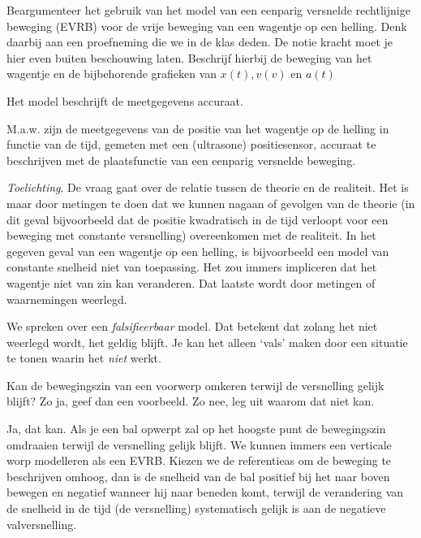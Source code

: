 \documentclass{ximera}
\begin{document}
\begin{exercise}
	Beargumenteer het gebruik van het model van een eenparig versnelde rechtlijnige beweging (EVRB) voor de vrije beweging van een wagentje op een helling. 
	Denk daarbij aan een proefneming die we in de klas deden. 
	De notie kracht moet je hier even buiten beschouwing laten.
	Beschrijf hierbij de beweging van het wagentje en de bijbehorende grafieken van \(x(t), v(v) \text{ en } a(t)\)
	\begin{oplossing}
		Het model beschrijft de meetgegevens accuraat.

		M.a.w. zijn de meetgegevens van de positie van het wagentje op de helling in functie van de tijd, gemeten met een (ultrasone) positiesensor, accuraat te beschrijven met de plaatsfunctie van een eenparig versnelde beweging.

		\emph{Toelichting}.
		De vraag gaat over de relatie tussen de theorie en de realiteit. Het is maar door metingen te doen dat we kunnen nagaan of gevolgen van de theorie (in dit geval bijvoorbeeld dat de positie kwadratisch in de tijd verloopt voor een beweging met constante versnelling) overeenkomen met de realiteit. In het gegeven geval van een wagentje op een helling, is bijvoorbeeld een model van constante snelheid niet van toepassing. Het zou immers impliceren dat het wagentje niet van zin kan veranderen. Dat laatste wordt door metingen of waarnemingen weerlegd.

		We spreken over een \textit{falsifieerbaar} model. Dat betekent dat zolang het niet weerlegd wordt, het geldig blijft. Je kan het alleen `vals' maken door een situatie te tonen waarin het \textit{niet} werkt.
	\end{oplossing} 
\end{exercise}


\begin{exercise}
	Kan de bewegingszin van een voorwerp omkeren terwijl de versnelling gelijk blijft? Zo ja, geef dan een voorbeeld. Zo nee, leg uit waarom dat niet kan.
	\begin{oplossing}
		Ja, dat kan. Als je een bal opwerpt zal op het hoogste punt de bewegingszin omdraaien terwijl de versnelling gelijk blijft. We kunnen immers een verticale worp modelleren als een EVRB. Kiezen we de referentieas om de beweging te beschrijven omhoog, dan is de snelheid van de bal positief bij het naar boven bewegen en negatief wanneer hij naar beneden komt, terwijl de verandering van de snelheid in de tijd (de versnelling) systematisch gelijk is aan de negatieve valversnelling.
	\end{oplossing}
\end{exercise}
\end{document}
